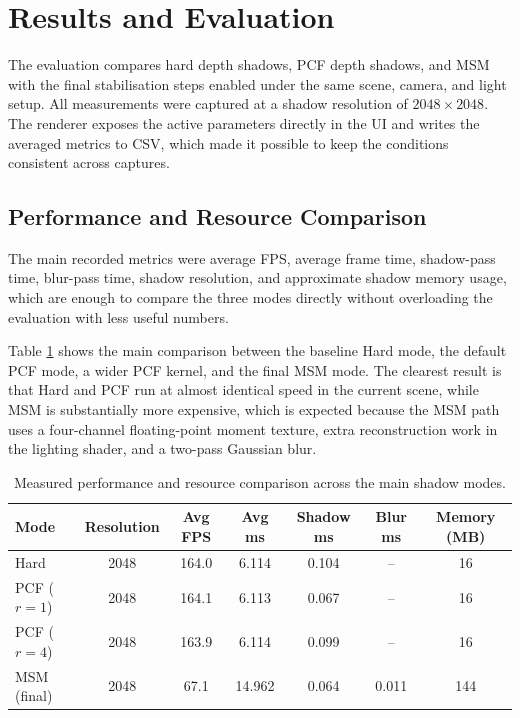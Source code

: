 \section{Results and Evaluation}

The evaluation compares hard depth shadows, PCF depth shadows, and MSM with the final stabilisation steps enabled under the same scene, camera, and light setup. All measurements were captured at a shadow resolution of $2048 \times 2048$. The renderer exposes the active parameters directly in the UI and writes the averaged metrics to CSV, which made it possible to keep the conditions consistent across captures.

\subsection{Performance and Resource Comparison}

The main recorded metrics were average FPS, average frame time, shadow-pass time, blur-pass time, shadow resolution, and approximate shadow memory usage, which are enough to compare the three modes directly without overloading the evaluation with less useful numbers.

Table \ref{tab:performance} shows the main comparison between the baseline Hard mode, the default PCF mode, a wider PCF kernel, and the final MSM mode. The clearest result is that Hard and PCF run at almost identical speed in the current scene, while MSM is substantially more expensive, which is expected because the MSM path uses a four-channel floating-point moment texture, extra reconstruction work in the lighting shader, and a two-pass Gaussian blur.

\begin{table}[H]
    \centering
    \caption{Measured performance and resource comparison across the main shadow modes.}
    \label{tab:performance}
    \begin{tabular}{lcccccc}
        \toprule
        Mode & Resolution & Avg FPS & Avg ms & Shadow ms & Blur ms & Memory (MB) \\
        \midrule
        Hard & 2048 & 164.0 & 6.114 & 0.104 & --    & 16 \\
        PCF ($r=1$) & 2048 & 164.1 & 6.113 & 0.067 & --    & 16 \\
        PCF ($r=4$) & 2048 & 163.9 & 6.114 & 0.099 & --    & 16 \\
        MSM (final) & 2048 & 67.1 & 14.962 & 0.064 & 0.011 & 144 \\
        \bottomrule
    \end{tabular}
\end{table}

